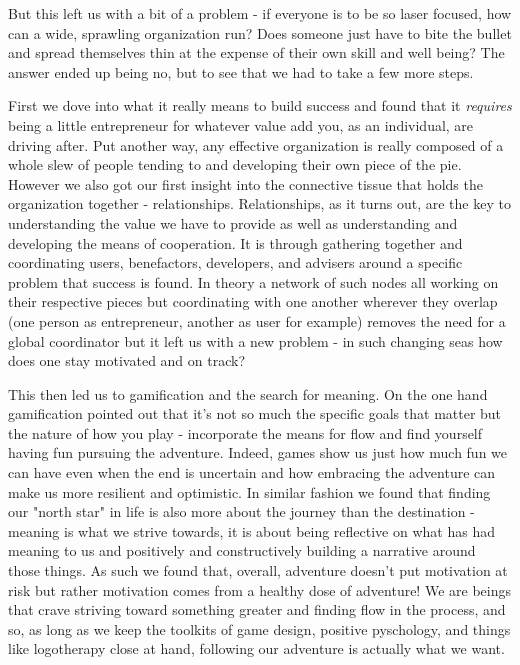 \documentclass[11pt,a5paper]{book}
\begin{document}
But this left us with a bit of a problem - if everyone is to be so laser focused, how can a wide, sprawling organization run? Does someone just have to bite the bullet and spread themselves thin at the expense of their own skill and well being? The answer ended up being no, but to see that we had to take a few more steps. 
\newline

First we dove into what it really means to build success and found that it \textit{requires} being a little entrepreneur for whatever value add you, as an individual, are driving after. Put another way, any effective organization is really composed of a whole slew of people tending to and developing their own piece of the pie. However we also got our first insight into the connective tissue that holds the organization together - relationships. Relationships, as it turns out, are the key to understanding the value we have to provide as well as understanding and developing the means of cooperation. It is through gathering together and coordinating users, benefactors, developers, and advisers around a specific problem that success is found. In theory a network of such nodes all working on their respective pieces but coordinating with one another wherever they overlap (one person as entrepreneur, another as user for example) removes the need for a global coordinator but it left us with a new problem - in such changing seas how does one stay motivated and on track?
\newline

This then led us to gamification and the search for meaning. On the one hand gamification pointed out that it's not so much the specific goals that matter but the nature of how you play - incorporate the means for flow and find yourself having fun pursuing the adventure. Indeed, games show us just how much fun we can have even when the end is uncertain and how embracing the adventure can make us more resilient and optimistic. In similar fashion we found that finding our "north star" in life is also more about the journey than the destination - meaning is what we strive towards, it is about being reflective on what has had meaning to us and positively and constructively building a narrative around those things. As such we found that, overall, adventure doesn't put motivation at risk but rather motivation comes from a healthy dose of adventure! We are beings that crave striving toward something greater and finding flow in the process, and so, as long as we keep the toolkits of game design, positive pyschology, and things like logotherapy close at hand, following our adventure is actually what we want.
\newline
\end{document}
